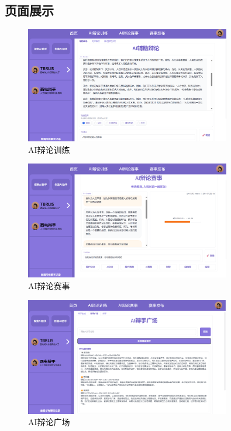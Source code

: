 \documentclass[a4paper,]{article}
\newcommand{\xiaosihao}{\fontsize{12pt}{\baselineskip}\selectfont}
\newcommand{\zw}{\setlength{\baselineskip}{1.5em}\xiaosihao}
\begin{document}
        \subsection{页面展示}
        \zw{以下是目前的页面展示，包括AI辩论训练，AI辩论赛事，AI辩论广场，聊天记录，赛事发布等区块。}
      \begin{figure}[H]
      	\centering
      	\includegraphics[width=0.8\textwidth,height=0.4\textwidth]{AI辅助破题.png}
      	\caption{AI辩论训练}
      \end{figure} 
        \begin{figure}[H]
      	\centering
      	\includegraphics[width=0.8\textwidth,height=0.4\textwidth]{AI赛事质询.png}
      	\caption{AI辩论赛事}
      \end{figure} 
        \begin{figure}[H]
      	\centering
      	\includegraphics[width=0.8\textwidth,height=0.4\textwidth]{AI辩手广场.png}
      	\caption{AI辩论广场}
      \end{figure} 
\end{document}
